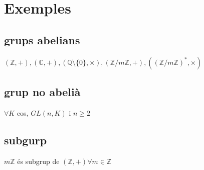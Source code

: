 \documentclass{article}
\newcommand{\Z}{\mathbb{Z}}
\newcommand{\Q}{\mathbb{Q}}
\newcommand{\C}{\mathbb{C}}
\begin{document}
\newpage\section{Exemples}
\subsection{grups abelians}
$(\Z, +), (\C, +), (\Q\setminus\{0\}, \times), (\Z/m\Z, +), ((\Z/m\Z)^*, \times)$
\subsection{grup no abelià}
$\forall K$ cos, $GL(n, K)$ i $n \ge 2$
\subsection{subgurp}
$m\Z$ és subgrup de $(\Z, +) \forall m \in \Z$
\end{document}
